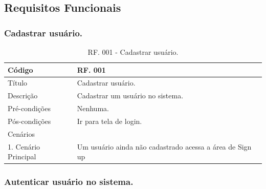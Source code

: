 \documentclass[11pt]{article}
\begin{document}
    \subsection{Requisitos Funcionais}
    
      \subsubsection{Cadastrar usuário.}
      
        \begin{table}[h]
          \begin{center}
              \begin{tabular}{ | p{5cm} | p{10cm} | }
                \hline
                Código\cellcolor{gray} & RF. 001\cellcolor{gray} \\
                \hline
                Título & Cadastrar usuário. \\
                \hline
                Descrição & Cadastrar um usuário no sistema. \\
                \hline
                Pré-condições & Nenhuma. \\
                \hline
                Pós-condições & Ir para tela de login. \\
                \hline
                Cenários &   \\
                \hline
                1.  Cenário Principal & Um usuário ainda não cadastrado acessa a área de Sign up \\
                \hline
              \end{tabular}
            \caption{RF. 001 - Cadastrar usuário.}
          \end{center}
        \end{table}

      \subsubsection{Autenticar usuário no sistema.}
\end{document}
